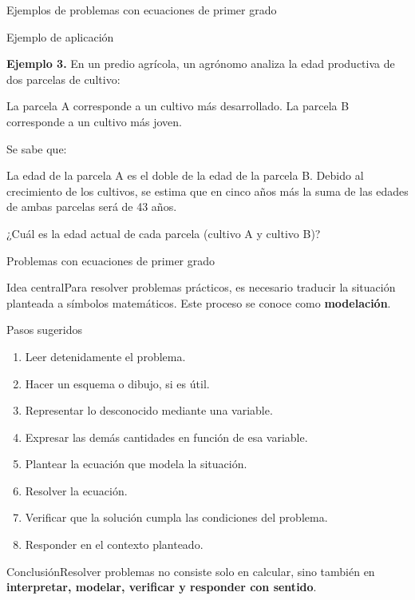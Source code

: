\documentclass[10pt]{beamer}
\begin{document}
\begin{frame}{Ejemplos de problemas con ecuaciones de primer grado}

	\begin{block}{Ejemplo de aplicación}%
		
		\textbf{Ejemplo 3.} En un predio agrícola, un agrónomo analiza la edad productiva de dos parcelas de cultivo:
		
		La parcela A corresponde a un cultivo más desarrollado.
		La parcela B corresponde a un cultivo más joven.
		
		Se sabe que:
		
		La edad de la parcela A es el doble de la edad de la parcela B.
		Debido al crecimiento de los cultivos, se estima que en cinco años más la suma de las edades de ambas parcelas será de 43 años.
			
		¿Cuál es la edad actual de cada parcela (cultivo A y cultivo B)?
		
\end{block}%

\end{frame}%

\begin{frame}{Problemas con ecuaciones de primer grado}\begin{block}{Idea central}\small Para resolver problemas prácticos, es necesario traducir la situación planteada a símbolos matemáticos.  Este proceso se conoce como \textbf{modelación}.\end{block}\pause\begin{block}{Pasos sugeridos}\small \begin{enumerate}\item Leer detenidamente el problema.\item Hacer un esquema o dibujo, si es útil.\item Representar lo desconocido mediante una variable.\item Expresar las demás cantidades en función de esa variable.\item Plantear la ecuación que modela la situación.\item Resolver la ecuación.\item Verificar que la solución cumpla las condiciones del problema.\item Responder en el contexto planteado.\end{enumerate}\end{block}\pause\begin{alertblock}{\small Conclusión}\small Resolver problemas no consiste solo en calcular, sino también en \textbf{interpretar, modelar, verificar y responder con sentido}.\end{alertblock}\end{frame}
\end{document}
